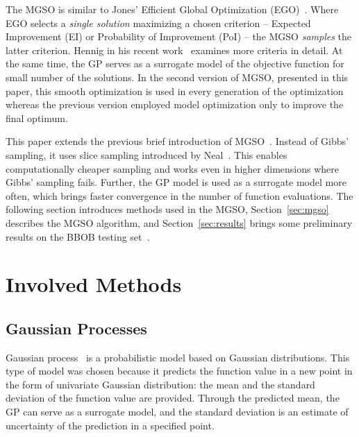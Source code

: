 \documentclass{itatnew}
\begin{document}
The MGSO is similar to Jones' Efficient Global Optimization (EGO)~\cite{jones_efficient_1998}.
Where EGO selects a \emph{single solution} maximizing a chosen criterion -- Expected Improvement (EI) or Probability of Improvement (PoI) -- the MGSO \emph{samples} the latter criterion. Hennig in his recent work~\cite{hennig_entropy_2012} examines more criteria in detail. 
At the same time, the GP serves as a surrogate model of the objective function for small number of the solutions. In the second version of MGSO, presented in this paper, this smooth optimization is used in every generation of the optimization whereas the previous version employed model optimization only to improve the final optimum.

This paper extends the previous brief introduction of MGSO~\cite{bajer_model_2013}. Instead of Gibbs' sampling, it uses slice sampling introduced by Neal~\cite{neal_slice_2003}. This enables computationally cheaper sampling and works even in higher dimensions where Gibbs' sampling fails. Further, the GP model is used as a surrogate model more often, which brings faster convergence in the number of function evaluations. The following section introduces methods used in the MGSO, Section~\ref{sec:mgso} describes the MGSO algorithm, and Section~\ref{sec:results} brings some preliminary results on the BBOB testing set~\cite{hansen_real_2009}.


\section{Involved Methods}

\subsection{Gaussian Processes}

Gaussian process~\cite{rasmussen_gaussian_2006} is a probabilistic model based on Gaussian distributions. This type of model was chosen because it predicts the function value in a new point in the form of univariate Gaussian distribution: the mean and the standard deviation of the function value are provided. Through the predicted mean, the GP can serve as a surrogate model, and the standard deviation is an estimate of uncertainty of the prediction in a specified point.
\end{document}
